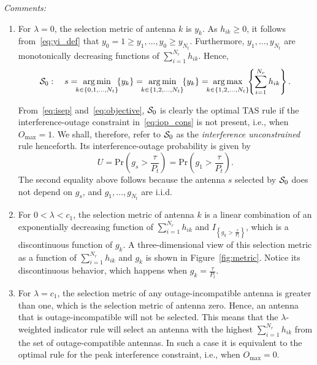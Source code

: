 \documentclass[12pt,draftcls,peerreview,onecolumn]{IEEEtran}
\newcommand{\brac}[1]{\left({#1}\right)}
\newcommand{\cbrac}[1]{\left\{{#1}\right\}}
\newcommand{\indic}[1]{I_{\cbrac{#1}}}
\newcommand{\ie}{{i.e.}}
\newcommand{\prob}[1]{\text{Pr}\brac{#1}}
\DeclareMathOperator*{\argmin}{arg\,min}
\DeclareMathOperator*{\argmax}{arg\,max}
\newcommand{\nx}{{0}}
\newcommand{\lam}{\lambda}
\newcommand{\Nt}{{N_t}}
\newcommand{\Nr}{{N_r}}
\newcommand{\Pt}{{P_t}}
\newcommand{\such}{h}
\newcommand{\puch}{g}
\newcommand{\hk}[1]{{\such_{#1}}}
\newcommand{\gk}[1]{{\puch_{#1}}}
\newcommand{\outmax}{O_{\text{max}}}
\newcommand{\itau}{\tau}
\newcommand{\cone}{c_{1}}
\newcommand{\taubypt}{\frac{\itau}{\Pt}}
\newcommand{\gkgrtaubypt}[1]{{\gk{#1}}>\taubypt}
\newcommand{\yk}[1]{y_{#1}}
\newcommand{\un}{U}
\newcommand{\allopts}{\left\{\nx,1,\ldots,\Nt\right\}}
\newcommand{\antopts}{\left\{1,2,\ldots,\Nt\right\}}
\newcommand{\caluncons}{{\cal S_{\text{0}}}}
\begin{document}
\newcommand{\sumnr}{\sum_{i=1}^{\Nr}}
{\em Comments:}
\begin{enumerate}
\item For $\lam=0$, the selection metric of antenna $k$ is $\yk{k}$. As $\hk{ik}\geq 0$, it follows from~\eqref{eq:yi_def} that $\yk{0}=1\geq\yk{1},\ldots,\yk{0}\geq\yk{\Nt}$. Furthermore, $\yk{1},\ldots,\yk{\Nt}$ are monotonically decreasing functions of $\sumnr\hk{ik}$. Hence, 
\begin{equation}
\caluncons:\quad s=\!\!\!\argmin\limits_{k\in\allopts}\!\! \left\{ \yk{k} \right\} = \!\!\!\argmin\limits_{k\in\antopts}\!\! \left\{ \yk{k} \right\} = \!\!\!\argmax\limits_{k\in\antopts}\!\! \left\{\sumnr \hk{ik} \right\}.
\label{eq:uncons_simple}
\end{equation}

From~\eqref{eq:isep} and~\eqref{eq:objective}, $\caluncons$ is clearly the optimal TAS rule if the interference-outage constraint in~\eqref{eq:iop_cons} is not present, \ie, when $\outmax=1$. We shall, therefore, refer to $\caluncons$ as the {\em interference unconstrained} rule henceforth. Its interference-outage probability is given by
%
\begin{equation}
\un= \prob{\gk{s}>\taubypt}=\prob{\gk{1}>\taubypt}.
\label{eq:uncomsoutage}
\end{equation}
%
The second equality above follows because the antenna $s$ selected by $\caluncons$ does not depend on $\gk{s}$, and $\gk{1},\ldots,\gk{\Nt}$ are i.i.d. 

\item For $0<\lam<\cone$, the selection metric of antenna $k$ is a linear combination of  an exponentially decreasing function of $\sumnr\hk{ik}$ and $\indic{\gkgrtaubypt{k}}$, which is a discontinuous function of $\gk{k}$. A three-dimensional view of this selection metric as a function of $\sumnr\hk{ik}$ and $\gk{k}$ is shown in Figure~\ref{fig:metric}. Notice its discontinuous behavior, which happens when $\gk{k}=\taubypt$. 

\item For $\lam=\cone$, the selection metric of any outage-incompatible antenna is greater than one, which is the selection metric of antenna zero. Hence, an antenna that is outage-incompatible will not be selected. This means that the $\lam$-weighted indicator rule will select an antenna with the highest $\sumnr\hk{ik}$ from the set of outage-compatible antennas. In such a case it is equivalent to the optimal rule for the peak interference constraint, \ie, when $\outmax=0$.


\end{enumerate}
\end{document}
